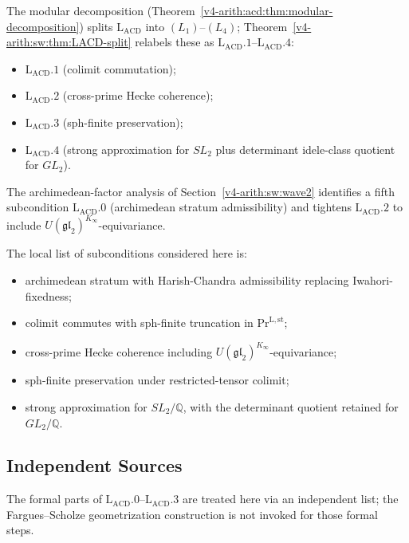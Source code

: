 The modular decomposition (Theorem~\ref{v4-arith:acd:thm:modular-decomposition})
splits \(\mathrm{L}_{\mathrm{ACD}}\) into \((L_{1})\)--\((L_{4})\);
Theorem~\ref{v4-arith:sw:thm:LACD-split} relabels these as
\(\mathrm{L}_{\mathrm{ACD}}.1\)--\(\mathrm{L}_{\mathrm{ACD}}.4\):
\begin{itemize}
\item \(\mathrm{L}_{\mathrm{ACD}}.1\) (colimit commutation);
\item \(\mathrm{L}_{\mathrm{ACD}}.2\) (cross-prime Hecke coherence);
\item \(\mathrm{L}_{\mathrm{ACD}}.3\) (sph-finite preservation);
\item \(\mathrm{L}_{\mathrm{ACD}}.4\) (strong approximation for
\(SL_{2}\) plus determinant idele-class quotient for \(GL_{2}\)).
\end{itemize}
The archimedean-factor analysis of Section~\ref{v4-arith:sw:wave2} identifies
a fifth subcondition \(\mathrm{L}_{\mathrm{ACD}}.0\) (archimedean
stratum admissibility) and tightens \(\mathrm{L}_{\mathrm{ACD}}.2\) to
include \(U(\mathfrak{gl}_{2})^{K_{\infty}}\)-equivariance.

The local list of subconditions considered here is:
\begin{itemize}
\item[\(\mathrm{L}_{\mathrm{ACD}}.0\):] archimedean stratum with
Harish-Chandra admissibility replacing Iwahori-fixedness;
\item[\(\mathrm{L}_{\mathrm{ACD}}.1\):] colimit commutes with
sph-finite truncation in \(\mathrm{Pr}^{\mathrm{L,st}}\);
\item[\(\mathrm{L}_{\mathrm{ACD}}.2\):] cross-prime Hecke coherence
including \(U(\mathfrak{gl}_{2})^{K_{\infty}}\)-equivariance;
\item[\(\mathrm{L}_{\mathrm{ACD}}.3\):] sph-finite preservation under
restricted-tensor colimit;
\item[\(\mathrm{L}_{\mathrm{ACD}}.4\):] strong approximation for
\(SL_{2}/\mathbb{Q}\), with the determinant quotient retained for
\(GL_{2}/\mathbb{Q}\).
\end{itemize}

\subsection{Independent Sources}

The formal parts of \(\mathrm{L}_{\mathrm{ACD}}.0\)--\(\mathrm{L}_{\mathrm{ACD}}.3\)
are treated here via an independent list; the Fargues--Scholze
geometrization construction is not invoked for those formal steps.


